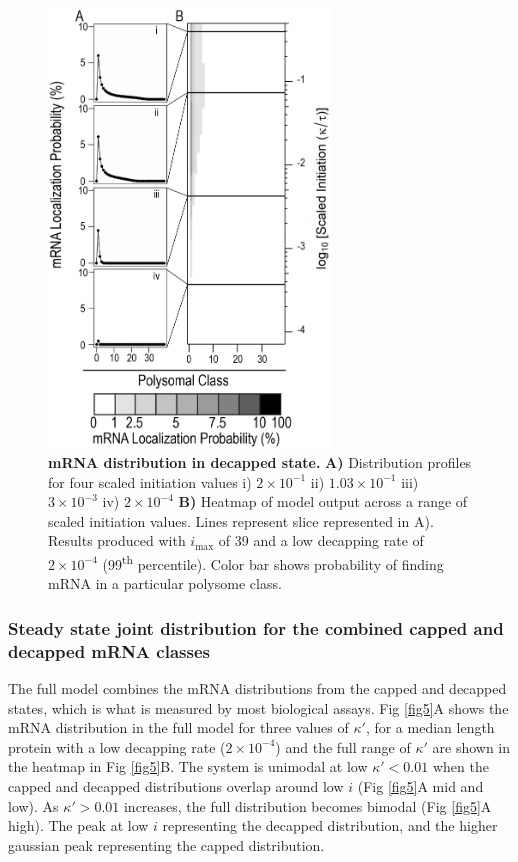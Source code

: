 \documentclass[10pt,letterpaper]{article}
\newcommand{\imax}{\ensuremath{{i_{\max}}}\xspace}
\begin{document}
\begin{figure}[!h]
\begin{center}
\includegraphics[width=75mm]{Images/2023-07-04_Marked_slices.png}
\caption{{\bf mRNA distribution in decapped state.}  {\bf A)} Distribution profiles for four scaled initiation values i) $2\times 10^{-1}$ ii) $1.03\times 10^{-1}$ iii) $3\times 10^{-3}$ iv) $2\times 10^{-4}$ {\bf B)} Heatmap of model output across a range of scaled initiation values. Lines represent slice represented in A). Results produced with \imax of 39 and a low decapping rate of $2\times10^{-4}$  (99\textsuperscript{th} percentile). Color bar shows probability of finding mRNA in a particular polysome class.}
\label{fig4}
\end{center}
\end{figure}


\subsubsection*{Steady state joint distribution for the combined capped and decapped mRNA classes}
The full model combines the mRNA distributions from the capped and decapped states, which is what is measured by most biological assays.
Fig \ref{fig5}A shows the mRNA distribution in the full model for three values of $\kappa'$, for a median length protein with a low decapping rate ($2\times10^{-4}$) and the full range of $\kappa'$ are shown in the heatmap in Fig \ref{fig5}B.
The system is unimodal at low $\kappa'<0.01$ when the capped and decapped distributions overlap around low $i$ (Fig \ref{fig5}A mid and low). 
As $\kappa'>0.01$ increases, the full distribution becomes bimodal (Fig \ref{fig5}A high).
The peak at low $i$ representing the decapped distribution, and the higher gaussian peak representing the capped distribution. 
\end{document}
